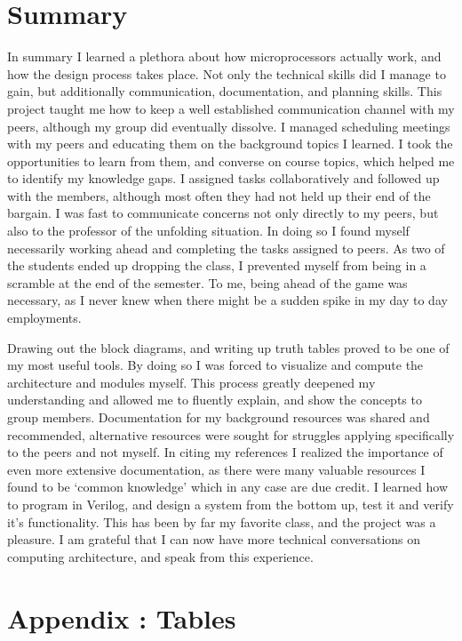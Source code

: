 \documentclass{article}
\begin{document}
\section{Summary}
In summary I learned a plethora about how microprocessors actually work, and how the design process takes place. 
Not only the technical skills did I manage to gain, but additionally communication, documentation, and planning skills. 
This project taught me how to keep a well established communication channel with my peers, although my group did eventually dissolve. 
I managed scheduling meetings with my peers and educating them on the background topics I learned. 
I took the opportunities to learn from them, and converse on course topics, which helped me to identify my knowledge gaps.  
I assigned tasks collaboratively and followed up with the members, although most often they had not held up their end of the bargain. 
I was fast to communicate concerns not only directly to my peers, but also to the professor of the unfolding situation. 
In doing so I found myself necessarily working ahead and completing the tasks assigned to peers. 
As two of the students ended up dropping the class, I prevented myself from being in a scramble at the end of the semester. 
To me, being ahead of the game was necessary, as I never knew when there might be a sudden spike in my day to day employments. 

Drawing out the block diagrams, and writing up truth tables proved to be one of my most useful tools. 
By doing so I was forced to visualize and compute the architecture and modules myself. 
This process greatly deepened my understanding and allowed me to fluently explain, and show the concepts to group members. 
Documentation for my background resources was shared and recommended, alternative resources were sought for struggles applying specifically to the peers and not myself. 
In citing my references I realized the importance of even more extensive documentation, as there were many valuable resources I found to be `common knowledge' which in any case are due credit. 
I learned how to program in Verilog, and design a system from the bottom up, test it and verify it's functionality. 
This has been by far my favorite class, and the project was a pleasure. 
I am grateful that I can now have more technical conversations on computing architecture, and speak from this experience. 

\newpage

\section{Appendix : Tables}
\end{document}
